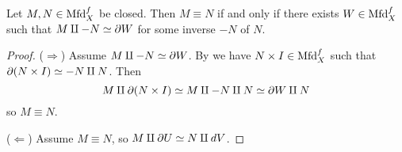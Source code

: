 \begin{proposition}
  Let $M,N \in \mathrm{Mfd}^f_X$ be closed. Then $M \equiv N$ if and
  only if there exists $W \in \mathrm{Mfd}^f_X$ such that $M \amalg -N
  \simeq \partial W$ for some inverse $-N$ of $N$.
\end{proposition}

\begin{proof}
  ($\Rightarrow$) Assume $M \amalg -N \simeq \partial W$. By  we
  have $N \times I \in \mathrm{Mfd}^f_X$ such that $\partial(N \times I) \simeq
  -N \amalg N$. Then
  \[
  M \amalg \partial(N \times I) \simeq M \amalg -N \amalg N \simeq \partial W
  \amalg N
  \]
  so $M \equiv N$.

  ($\Leftarrow$) Assume $M \equiv N$, so $M \amalg \partial U \simeq N
  \amalg d V$.
\end{proof}






